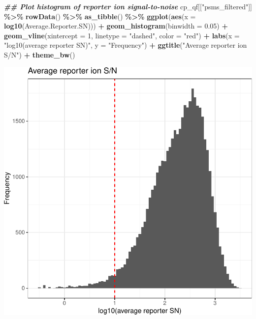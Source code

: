 \documentclass[9pt,a4paper,]{extarticle}
\newenvironment{Shaded}{\begin{snugshade}}{\end{snugshade}}
\newcommand{\AttributeTok}[1]{\textcolor[rgb]{0.13,0.29,0.53}{#1}}
\newcommand{\DecValTok}[1]{\textcolor[rgb]{0.00,0.00,0.81}{#1}}
\newcommand{\DocumentationTok}[1]{\textcolor[rgb]{0.56,0.35,0.01}{\textbf{\textit{#1}}}}
\newcommand{\FloatTok}[1]{\textcolor[rgb]{0.00,0.00,0.81}{#1}}
\newcommand{\FunctionTok}[1]{\textcolor[rgb]{0.13,0.29,0.53}{\textbf{#1}}}
\newcommand{\NormalTok}[1]{#1}
\newcommand{\SpecialCharTok}[1]{\textcolor[rgb]{0.81,0.36,0.00}{\textbf{#1}}}
\newcommand{\StringTok}[1]{\textcolor[rgb]{0.31,0.60,0.02}{#1}}
\begin{document}
\begin{Shaded}
\begin{Highlighting}[]
\DocumentationTok{\#\# Plot histogram of reporter ion signal{-}to{-}noise}
\NormalTok{cp\_qf[[}\StringTok{"psms\_filtered"}\NormalTok{]] }\SpecialCharTok{\%\textgreater{}\%} 
  \FunctionTok{rowData}\NormalTok{() }\SpecialCharTok{\%\textgreater{}\%} 
  \FunctionTok{as\_tibble}\NormalTok{() }\SpecialCharTok{\%\textgreater{}\%}
  \FunctionTok{ggplot}\NormalTok{(}\FunctionTok{aes}\NormalTok{(}\AttributeTok{x =} \FunctionTok{log10}\NormalTok{(Average.Reporter.SN))) }\SpecialCharTok{+}
  \FunctionTok{geom\_histogram}\NormalTok{(}\AttributeTok{binwidth =} \FloatTok{0.05}\NormalTok{) }\SpecialCharTok{+}
  \FunctionTok{geom\_vline}\NormalTok{(}\AttributeTok{xintercept =} \DecValTok{1}\NormalTok{, }\AttributeTok{linetype =} \StringTok{"dashed"}\NormalTok{, }\AttributeTok{color =} \StringTok{"red"}\NormalTok{) }\SpecialCharTok{+}
  \FunctionTok{labs}\NormalTok{(}\AttributeTok{x =} \StringTok{"log10(average reporter SN)"}\NormalTok{, }\AttributeTok{y =} \StringTok{"Frequency"}\NormalTok{) }\SpecialCharTok{+}
  \FunctionTok{ggtitle}\NormalTok{(}\StringTok{"Average reporter ion S/N"}\NormalTok{) }\SpecialCharTok{+}
  \FunctionTok{theme\_bw}\NormalTok{()}
\end{Highlighting}
\end{Shaded}

\begin{center}\includegraphics[height=0.3\textheight]{workflow_expressions_files/figure-latex/tmt_sn_ratio_2-1} \end{center}
\end{document}

